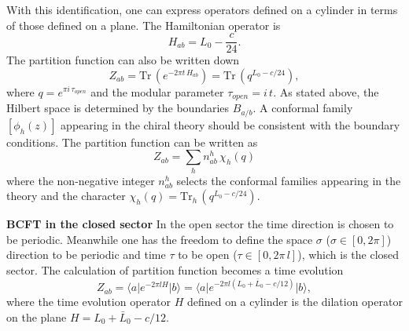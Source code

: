 \documentclass[submission, PhysLectNotes]{SciPost}
\begin{document}
With this identification, one can express operators defined on a cylinder in terms of those defined on a plane. The Hamiltonian operator is 
\begin{equation}
    H_{ab} = L_0 - \frac{c}{24}. 
\end{equation}
The partition function can also be written down 
\begin{equation}
    Z_{ab} = \mathrm{Tr}\,\left( e^{-2\pi t\, H_{ab}}\right) = \mathrm{Tr}\,\left( q^{L_0-c/24}\right),
\end{equation}
where $q=e^{\pi i\, \tau_{open}}$ and the modular parameter $\tau_{open} = i\,t$. As stated above, the Hilbert space is determined by the boundaries $B_{a/b}$. A conformal family $[\phi_{h}(z)]$ appearing in the chiral theory should be consistent with the boundary conditions. The partition function can be written as 
\begin{equation}
    Z_{ab} = \sum_h n_{ab}^h\, \chi_h(q)
\end{equation}
where the non-negative integer $n_{ab}^h$ selects the conformal families appearing in the theory and the character $\chi_h(q) = \mathrm{Tr}_h\,\left( q^{L_0-c/24}\right)$.

{\bf BCFT in the closed sector}
In the open sector the time direction is chosen to be periodic. Meanwhile one has the freedom to define the space $\sigma$ ($\sigma \in [0,2\pi]$) direction to be periodic and time $\tau$ to be open ($\tau \in [0,2\pi\,l]$), which is the closed sector. The calculation of partition function becomes a time evolution
\begin{equation}
    Z_{ab} = \langle a \vert e^{-2\pi l H} \vert b \rangle = \langle a \vert e^{-2\pi l (L_0 + \bar{L}_0 -c/12)} \vert b \rangle,
\end{equation}
where the time evolution operator $H$ defined on a cylinder is the dilation operator on the plane $H = L_0 + \bar{L}_0 - c/12$. 
\end{document}
